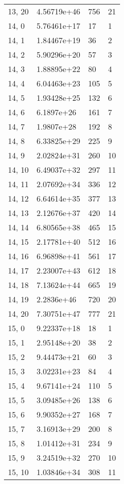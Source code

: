 \begin{table}
\begin{tabular}{llll}
13, 20 &  4.56719e+46 &  756 &    21 \\
14, 0  &  5.76461e+17 &   17 &     1 \\
14, 1  &  1.84467e+19 &   36 &     2 \\
14, 2  &  5.90296e+20 &   57 &     3 \\
14, 3  &  1.88895e+22 &   80 &     4 \\
14, 4  &  6.04463e+23 &  105 &     5 \\
14, 5  &  1.93428e+25 &  132 &     6 \\
14, 6  &   6.1897e+26 &  161 &     7 \\
14, 7  &   1.9807e+28 &  192 &     8 \\
14, 8  &  6.33825e+29 &  225 &     9 \\
14, 9  &  2.02824e+31 &  260 &    10 \\
14, 10 &  6.49037e+32 &  297 &    11 \\
14, 11 &  2.07692e+34 &  336 &    12 \\
14, 12 &  6.64614e+35 &  377 &    13 \\
14, 13 &  2.12676e+37 &  420 &    14 \\
14, 14 &  6.80565e+38 &  465 &    15 \\
14, 15 &  2.17781e+40 &  512 &    16 \\
14, 16 &  6.96898e+41 &  561 &    17 \\
14, 17 &  2.23007e+43 &  612 &    18 \\
14, 18 &  7.13624e+44 &  665 &    19 \\
14, 19 &   2.2836e+46 &  720 &    20 \\
14, 20 &  7.30751e+47 &  777 &    21 \\
15, 0  &  9.22337e+18 &   18 &     1 \\
15, 1  &  2.95148e+20 &   38 &     2 \\
15, 2  &  9.44473e+21 &   60 &     3 \\
15, 3  &  3.02231e+23 &   84 &     4 \\
15, 4  &  9.67141e+24 &  110 &     5 \\
15, 5  &  3.09485e+26 &  138 &     6 \\
15, 6  &  9.90352e+27 &  168 &     7 \\
15, 7  &  3.16913e+29 &  200 &     8 \\
15, 8  &  1.01412e+31 &  234 &     9 \\
15, 9  &  3.24519e+32 &  270 &    10 \\
15, 10 &  1.03846e+34 &  308 &    11 \\

\end{tabular}
\end{table}
